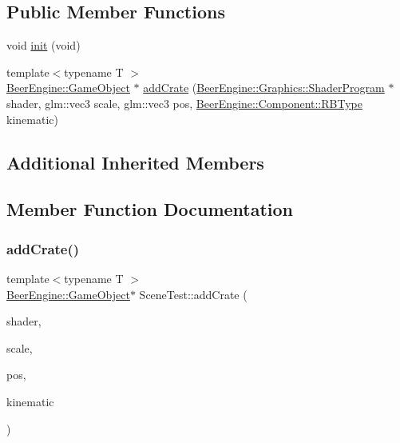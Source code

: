 \subsection*{Public Member Functions}
\begin{DoxyCompactItemize}
\item 
void \mbox{\hyperlink{class_scene_test_aedded03410798c3705fb3fb028e56ab5}{init}} (void)
\item 
{\footnotesize template$<$typename T $>$ }\\\mbox{\hyperlink{class_beer_engine_1_1_game_object}{Beer\+Engine\+::\+Game\+Object}} $\ast$ \mbox{\hyperlink{class_scene_test_a29d4ffbd6a5035a4d62e9e59b311f791}{add\+Crate}} (\mbox{\hyperlink{class_beer_engine_1_1_graphics_1_1_shader_program}{Beer\+Engine\+::\+Graphics\+::\+Shader\+Program}} $\ast$shader, glm\+::vec3 scale, glm\+::vec3 pos, \mbox{\hyperlink{namespace_beer_engine_1_1_component_a2cfe279cc309b6420e792597940b8a33}{Beer\+Engine\+::\+Component\+::\+R\+B\+Type}} kinematic)
\end{DoxyCompactItemize}
\subsection*{Additional Inherited Members}


\subsection{Member Function Documentation}
\mbox{\label{class_scene_test_a29d4ffbd6a5035a4d62e9e59b311f791}} 
\subsubsection{\texorpdfstring{add\+Crate()}{addCrate()}}
{\footnotesize\ttfamily template$<$typename T $>$ \\
\mbox{\hyperlink{class_beer_engine_1_1_game_object}{Beer\+Engine\+::\+Game\+Object}}$\ast$ Scene\+Test\+::add\+Crate (\begin{DoxyParamCaption}\item[{\mbox{\hyperlink{class_beer_engine_1_1_graphics_1_1_shader_program}{Beer\+Engine\+::\+Graphics\+::\+Shader\+Program}} $\ast$}]{shader,  }\item[{glm\+::vec3}]{scale,  }\item[{glm\+::vec3}]{pos,  }\item[{\mbox{\hyperlink{namespace_beer_engine_1_1_component_a2cfe279cc309b6420e792597940b8a33}{Beer\+Engine\+::\+Component\+::\+R\+B\+Type}}}]{kinematic }\end{DoxyParamCaption})}

